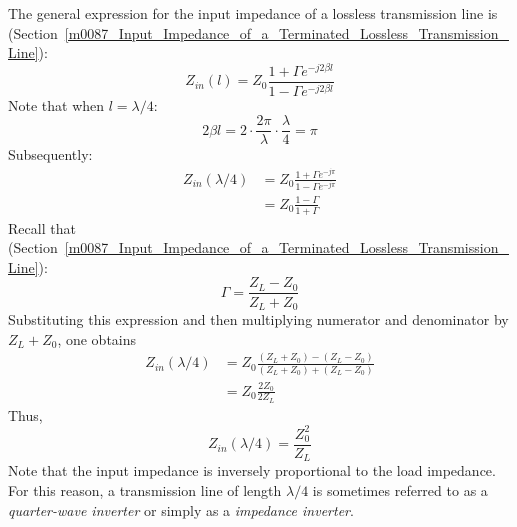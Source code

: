 The general expression for the input impedance of a lossless transmission line is (Section~\ref{m0087_Input_Impedance_of_a_Terminated_Lossless_Transmission_Line}):
%
\begin{equation}
Z_{in}(l) = Z_0 \frac{ 1 + \Gamma e^{-j2\beta l} }{  1 - \Gamma e^{-j2\beta l} }
\label{m0093_eZ}
\end{equation}
%
Note that when $l=\lambda/4$:
%
\begin{equation}
2\beta l = 2 \cdot \frac{2\pi}{\lambda} \cdot \frac{\lambda}{4} = \pi 
\nonumber
\end{equation}
%
Subsequently:
%
\begin{equation}
\begin{split}
Z_{in}(\lambda/4) &= Z_0 \frac{ 1 + \Gamma e^{-j\pi} }{  1 - \Gamma e^{-j\pi} } \\
                  &= Z_0 \frac{ 1 - \Gamma }{  1 + \Gamma }
\end{split}
\end{equation}
%
Recall that (Section~\ref{m0087_Input_Impedance_of_a_Terminated_Lossless_Transmission_Line}):
%
\begin{equation}
\Gamma = \frac{Z_L-Z_0}{Z_L+Z_0}
\end{equation}
%
Substituting this expression and then multiplying numerator and denominator by $Z_L+Z_0$, one obtains
%
\begin{equation}
\begin{split}
Z_{in}(\lambda/4) &= Z_0 \frac{ \left( Z_L + Z_0\right) - \left(Z_L - Z_0\right) }{ \left( Z_L + Z_0\right) + \left(Z_L - Z_0\right)  } \\
                  &= Z_0 \frac{ 2Z_0 }{  2Z_L }
\end{split}
\end{equation}
%
Thus,
%
\begin{equation}
\boxed{
Z_{in}(\lambda/4) = \frac{Z_0^2 }{  Z_L }
}
\label{m0091_eQWII}
\end{equation}
%
Note that the input impedance is inversely proportional to the load impedance.
For this reason, a transmission line of length $\lambda/4$ is sometimes referred to as a \emph{quarter-wave inverter} 
or simply as a \emph{impedance inverter}.

